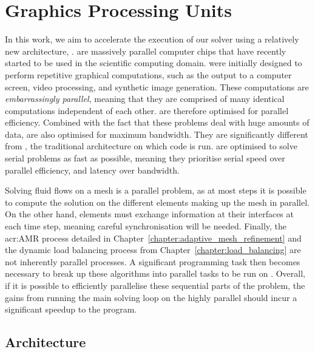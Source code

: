 \chapter{Graphics Processing Units}\label{chapter:graphics_processing_units}

In this work, we aim to accelerate the execution of our solver using a relatively new architecture,
.  are massively parallel computer chips that have recently
started to be used in the scientific computing domain.  were initially designed
to perform repetitive graphical computations, such as the output to a computer screen, video
processing, and synthetic image generation. These computations are \textit{embarrassingly parallel},
meaning that they are comprised of many identical computations independent of each other.
 are therefore optimised for parallel efficiency. Combined with the fact that
these problems deal with huge amounts of data,  are also optimised for maximum
bandwidth. They are significantly different from \textit{}, the traditional
architecture on which code is run.  are optimised to solve serial problems as
fast as possible, meaning they prioritise serial speed over parallel efficiency, and latency over
bandwidth. 

Solving fluid flows on a mesh is a parallel problem, as at most steps it is possible to compute the
solution on the different elements making up the mesh in parallel. On the other hand, elements must
exchange information at their interfaces at each time step, meaning careful synchronisation will be
needed. Finally, the \acrlong{acr:AMR} process detailed in
Chapter~\ref{chapter:adaptive_mesh_refinement} and the dynamic load balancing process from
Chapter~\ref{chapter:load_balancing} are not inherently parallel processes. A significant
programming task then becomes necessary to break up these algorithms into parallel tasks to be run
on . Overall, if it is possible to efficiently parallelise these sequential
parts of the problem, the gains from running the main solving loop on the highly parallel
 should incur a significant speedup to the program.

\section{Architecture}\label{section:graphics_processing_units:architecture}

